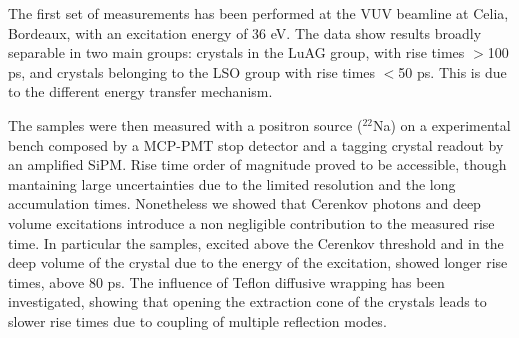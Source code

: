 The first set of measurements has been performed at the VUV beamline at Celia, Bordeaux, with an excitation energy of 36 eV. 
The data show results broadly separable in two main groups: crystals in the LuAG group, with rise times $>$100 ps, and crystals belonging to the LSO group with rise times $<$50 ps. This is due to the different energy transfer mechanism.

The samples were then measured with a positron source ($^{22}$Na) on a experimental bench composed by a MCP-PMT stop detector and a tagging crystal readout by an amplified SiPM.
Rise time order of magnitude proved to be accessible, though mantaining large uncertainties due to the limited resolution and the long accumulation times.
Nonetheless we showed that Cerenkov photons and deep volume excitations introduce a non negligible contribution to the measured rise time. In particular the samples, excited above the Cerenkov threshold and in the deep volume of the crystal due to the energy of the excitation, showed longer rise times, above 80 ps.
The influence of Teflon diffusive wrapping has been investigated, showing that opening the extraction cone of the crystals leads to slower rise times due to coupling of multiple reflection modes.


